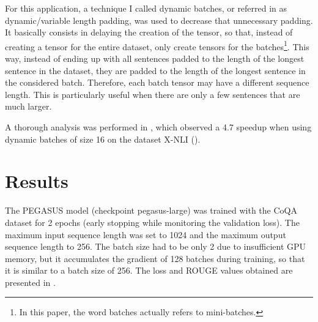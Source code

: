 \documentclass[a4paper, 10pt]{article}
\begin{document}
            For this application, a technique I called dynamic batches, or referred in \cite{Benesty2020} as dynamic/variable length padding, was used to decrease that unnecessary padding. It basically consists in delaying the creation of the tensor, so that, instead of creating a tensor for the entire dataset, only create tensors for the batches\footnote{In this paper, the word batches actually refers to mini-batches.}. This way, instead of ending up with all sentences padded to the length of the longest sentence in the dataset, they are padded to the length of the longest sentence in the considered batch. Therefore, each batch tensor may have a different sequence length. This is particularly useful when there are only a few sentences that are much larger.
            
            A thorough analysis was performed in \cite{Benesty2020}, which observed a 4.7 speedup when using dynamic batches of size 16 on the dataset X-NLI (\cite{Conneau2018}).
    
\section{Results}

    The PEGASUS model (checkpoint pegasus-large) was trained with the CoQA dataset for 2 epochs (early stopping while monitoring the validation loss). The maximum input sequence length was set to 1024 and the maximum output sequence length to 256. The batch size had to be only 2 due to insufficient GPU memory, but it accumulates the gradient of 128 batches during training, so that it is similar to a batch size of 256. The loss and ROUGE values obtained  are presented in .
    
\end{document}
